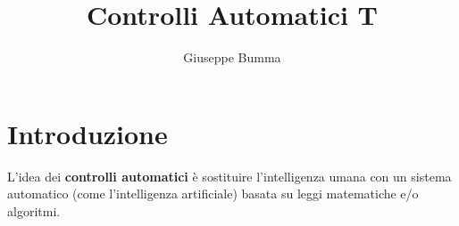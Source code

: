 \documentclass{article}
\title{Controlli Automatici T}
\author{Giuseppe Bumma}
\numberwithin{equation}{subsection}
\let\oldsection\section%
\renewcommand{\section}{%
  \renewcommand{\theequation}{\thesection.\arabic{equation}}%
  \oldsection}%
\begin{document}
\newcommand{\R}{\mathbb{R}}
\newcommand{\Varepsilon}{\mathcal{E}}
\newcommand{\rad}{\text{rad}}
\newcommand{\bb}[1]{\mathbb{#1}}
\newcommand{\cc}[1]{\mathcal{#1}}
\newcommand{ \lognormal }{\text{Lognormal} }
\newcommand{\T}[1]{\text{#1}}
\newcommand*\circled[1]{\tikz[baseline=(char.base)]{%
            \node[shape=circle,draw,inner sep=2pt] (char) {#1};}}


\tableofcontents

\maketitle

\section{Introduzione}
L'idea dei \textbf{controlli automatici} è sostituire l'intelligenza umana con un sistema automatico (come l'intelligenza artificiale) basata su leggi matematiche e/o algoritmi.
\end{document}
